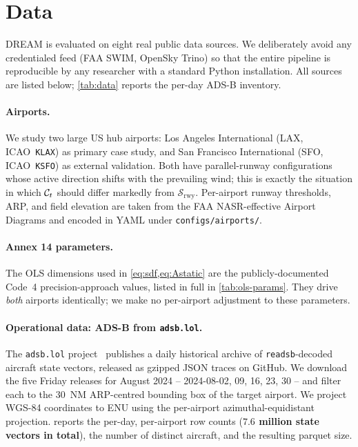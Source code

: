 \section{Data}
\label{sec:data}

DREAM is evaluated on eight real public data sources. We deliberately avoid
any credentialed feed (FAA SWIM, OpenSky Trino) so that the entire pipeline
is reproducible by any researcher with a standard Python installation. All
sources are listed below; \cref{tab:data} reports the per-day ADS-B inventory.

\paragraph{Airports.}
We study two large US hub airports: Los Angeles International (LAX,
ICAO~\texttt{KLAX}) as primary case study, and San Francisco International
(SFO, ICAO~\texttt{KSFO}) as external validation. Both have parallel-runway
configurations whose active direction shifts with the prevailing wind;
this is exactly the situation in which $\mathcal{C}_t$ should differ markedly from
$\mathcal{S}_{\mathrm{rwy}}$. Per-airport runway thresholds, ARP, and field
elevation are taken from the FAA NASR-effective Airport Diagrams and
encoded in YAML under \texttt{configs/airports/}.

\paragraph{Annex 14 parameters.}
The OLS dimensions used in \cref{eq:sdf,eq:Astatic} are the
publicly-documented Code~4 precision-approach values, listed in full in
\cref{tab:ols-params}. They drive \emph{both} airports identically; we make
no per-airport adjustment to these parameters.

\paragraph{Operational data: ADS-B from \texttt{adsb.lol}.}
The \texttt{adsb.lol} project~\citep{adsblol_history} publishes a daily
historical archive of \texttt{readsb}-decoded aircraft state vectors,
released as gzipped JSON traces on GitHub. We download the five Friday
releases for August 2024 -- 2024-08-02, 09, 16, 23, 30 -- and filter each
to the 30~NM ARP-centred bounding box of the target airport. We project
WGS-84 coordinates to ENU using the per-airport
azimuthal-equidistant projection.  reports the per-day,
per-airport row counts (\textbf{$7.6$ million state vectors in total}),
the number of distinct aircraft, and the resulting parquet size.

